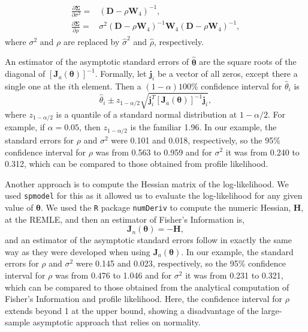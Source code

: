 \documentclass[12pt, titlepage]{article}
\begin{document}
\begin{align*}
	\frac{\partial \boldsymbol{\Sigma}}{\partial\sigma^{2}} = & (\mathbf{D} - \rho\mathbf{W}_{4})^{-1}, \\
	\frac{\partial \boldsymbol{\Sigma}}{\partial\rho} = & \sigma^{2}(\mathbf{D} - \rho\mathbf{W}_{4})^{-1}\mathbf{W}_{4}(\mathbf{D} - \rho\mathbf{W}_{4})^{-1},
\end{align*}
where $\sigma^{2}$ and $\rho$ are replaced by $\hat{\sigma}^{2}$ and $\hat{\rho}$, respectively. 

An estimator of the asymptotic standard errors of $\hat{\boldsymbol{\theta}}$ are the square roots of the diagonal of $[\boldsymbol{J}_{a}{(\boldsymbol{\theta})}]^{-1}$.  Formally, let $\mathbf{j}_{i}$ be a vector of all zeros, except there a single one at the $i$th element.  Then a $(1 - \alpha)100$\% confidence interval for $\hat{\theta}_{i}$ is
$$
\hat{\theta}_{i} \pm z_{1-\alpha/2}\sqrt{\mathbf{j}_{i}^{T}[\boldsymbol{J}_{a}{(\boldsymbol{\theta})}]^{-1}\mathbf{j}_{i}},
$$
where $z_{1-\alpha/2}$ is a quantile of a standard normal distribution at $1-\alpha/2$.  For example, if $\alpha = 0.05$, then $z_{1-\alpha/2}$ is the familiar 1.96.  In our example, the standard errors for $\rho$ and $\sigma^{2}$ were 0.101 and 0.018, respectively, so the 95\% confidence interval for $\rho$ was from 0.563 to 0.959 and for $\sigma^{2}$ it was from 0.240 to 0.312, which can be compared to those obtained from profile likelihood.

Another approach is to compute the Hessian matrix of the log-likelihood.  We used \texttt{spmodel} for this as it allowed us to evaluate the log-likelihood for any given value of $\boldsymbol{\theta}$.  We used the \texttt{R} package \texttt{numDeriv} to compute the numeric Hessian, $\mathbf{H}$, at the REMLE, and then an estimator of Fisher's Information is,
$$
\boldsymbol{J}_{n}{(\boldsymbol{\theta})} = -\mathbf{H},
$$
and an estimator of the asymptotic standard errors follow in exactly the same way as they were developed when using $\boldsymbol{J}_{a}{(\boldsymbol{\theta})}$.  In our example, the standard errors for $\rho$ and $\sigma^{2}$ were 0.145 and 0.023, respectively, so the 95\% confidence interval for $\rho$ was from 0.476 to 1.046 and for $\sigma^{2}$ it was from 0.231 to 0.321, which can be compared to those obtained from the analytical computation of Fisher's Information and profile likelihood.  Here, the confidence interval for $\rho$ extends beyond 1 at the upper bound, showing a disadvantage of the large-sample asymptotic approach that relies on normality.
\end{document}
